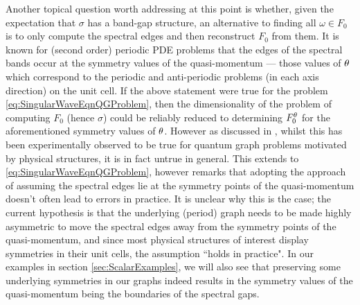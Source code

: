 
Another topical question worth addressing at this point is whether, given the expectation that $\sigma$ has a band-gap structure, an alternative to finding all $\omega\in F_0$ is to only compute the spectral edges and then reconstruct $F_0$ from them.
It is known for (second order) periodic PDE problems that the edges of the spectral bands occur at the symmetry values of the quasi-momentum --- those values of $\theta$ which correspond to the periodic and anti-periodic problems (in each axis direction) on the unit cell.
If the above statement were true for the problem \eqref{eq:SingularWaveEqnQGProblem}, then the dimensionality of the problem of computing $F_0$ (hence $\sigma$) could be reliably reduced to determining $F_0^\theta$ for the aforementioned symmetry values of $\theta$.
However as discussed in \cite[Chapter 4.6]{berkolaiko2013introduction}, whilst this has been experimentally observed to be true for quantum graph problems motivated by physical structures, it is in fact untrue in general.
This extends to \eqref{eq:SingularWaveEqnQGProblem}, however \cite[Chapter 4.6]{berkolaiko2013introduction} remarks that adopting the approach of assuming the spectral edges lie at the symmetry points of the quasi-momentum doesn't often lead to errors in practice.
It is unclear why this is the case; the current hypothesis is that the underlying (period) graph needs to be made highly asymmetric to move the spectral edges away from the symmetry points of the quasi-momentum, and since most physical structures of interest display symmetries in their unit cells, the assumption ``holds in practice".
In our examples in section \ref{sec:ScalarExamples}, we will also see that preserving some underlying symmetries in our graphs indeed results in the symmetry values of the quasi-momentum being the boundaries of the spectral gaps.